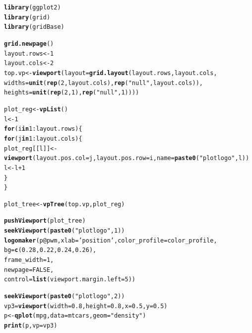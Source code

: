 \documentclass[12pt]{article}\usepackage[]{graphicx}\usepackage[usenames,dvipsnames]{color}
\makeatletter
\newcommand{\hlnum}[1]{\textcolor[rgb]{0.686,0.059,0.569}{#1}}%
\newcommand{\hlstr}[1]{\textcolor[rgb]{0.192,0.494,0.8}{#1}}%
\newcommand{\hlopt}[1]{\textcolor[rgb]{0,0,0}{#1}}%
\newcommand{\hlstd}[1]{\textcolor[rgb]{0.345,0.345,0.345}{#1}}%
\newcommand{\hlkwa}[1]{\textcolor[rgb]{0.161,0.373,0.58}{\textbf{#1}}}%
\newcommand{\hlkwb}[1]{\textcolor[rgb]{0.69,0.353,0.396}{#1}}%
\newcommand{\hlkwc}[1]{\textcolor[rgb]{0.333,0.667,0.333}{#1}}%
\newcommand{\hlkwd}[1]{\textcolor[rgb]{0.737,0.353,0.396}{\textbf{#1}}}%
\newenvironment{kframe}{%
 \def\at@end@of@kframe{}%
 \ifinner\ifhmode%
  \def\at@end@of@kframe{\end{minipage}}%
  \begin{minipage}{\columnwidth}%
 \fi\fi%
 \def\FrameCommand##1{\hskip\@totalleftmargin \hskip-\fboxsep
 \colorbox{shadecolor}{##1}\hskip-\fboxsep
     \hskip-\linewidth \hskip-\@totalleftmargin \hskip\columnwidth}%
 \MakeFramed {\advance\hsize-\width
   \@totalleftmargin\z@ \linewidth\hsize
   \@setminipage}}%
 {\par\unskip\endMakeFramed%
 \at@end@of@kframe}
\newenvironment{knitrout}{}{} %
\makeatother
\begin{document}
\begin{knitrout}
\color{fgcolor}\begin{kframe}
\begin{alltt}
\hlkwd{library}\hlstd{(ggplot2)}
\hlkwd{library}\hlstd{(grid)}
\hlkwd{library}\hlstd{(gridBase)}


\hlkwd{grid.newpage}\hlstd{()}
\hlstd{layout.rows} \hlkwb{<-} \hlnum{1}
\hlstd{layout.cols} \hlkwb{<-} \hlnum{2}
\hlstd{top.vp} \hlkwb{<-} \hlkwd{viewport}\hlstd{(}\hlkwc{layout}\hlstd{=}\hlkwd{grid.layout}\hlstd{(layout.rows, layout.cols,}
                                      \hlkwc{widths}\hlstd{=}\hlkwd{unit}\hlstd{(}\hlkwd{rep}\hlstd{(}\hlnum{2}\hlstd{,layout.cols),} \hlkwd{rep}\hlstd{(}\hlstr{"null"}\hlstd{, layout.cols)),}
                                      \hlkwc{heights}\hlstd{=}\hlkwd{unit}\hlstd{(}\hlkwd{rep}\hlstd{(}\hlnum{2}\hlstd{,}\hlnum{1}\hlstd{),} \hlkwd{rep}\hlstd{(}\hlstr{"null"}\hlstd{,}\hlnum{1}\hlstd{))))}

\hlstd{plot_reg} \hlkwb{<-} \hlkwd{vpList}\hlstd{()}
\hlstd{l} \hlkwb{<-} \hlnum{1}
\hlkwa{for}\hlstd{(i} \hlkwa{in} \hlnum{1}\hlopt{:}\hlstd{layout.rows)\{}
  \hlkwa{for}\hlstd{(j} \hlkwa{in} \hlnum{1}\hlopt{:}\hlstd{layout.cols)\{}
    \hlstd{plot_reg[[l]]} \hlkwb{<-} \hlkwd{viewport}\hlstd{(}\hlkwc{layout.pos.col} \hlstd{= j,} \hlkwc{layout.pos.row} \hlstd{= i,} \hlkwc{name} \hlstd{=} \hlkwd{paste0}\hlstd{(}\hlstr{"plotlogo"}\hlstd{, l))}
    \hlstd{l} \hlkwb{<-} \hlstd{l}\hlopt{+}\hlnum{1}
  \hlstd{\}}
\hlstd{\}}


\hlstd{plot_tree} \hlkwb{<-} \hlkwd{vpTree}\hlstd{(top.vp, plot_reg)}

\hlkwd{pushViewport}\hlstd{(plot_tree)}
\hlkwd{seekViewport}\hlstd{(}\hlkwd{paste0}\hlstd{(}\hlstr{"plotlogo"}\hlstd{,} \hlnum{1}\hlstd{))}
\hlkwd{logomaker}\hlstd{(p}\hlopt{@}\hlkwc{pwm}\hlstd{,}\hlkwc{xlab} \hlstd{=} \hlstr{'position'}\hlstd{,}\hlkwc{color_profile} \hlstd{= color_profile,}
          \hlkwc{bg} \hlstd{=} \hlkwd{c}\hlstd{(}\hlnum{0.28}\hlstd{,} \hlnum{0.22}\hlstd{,} \hlnum{0.24}\hlstd{,} \hlnum{0.26}\hlstd{),}
          \hlkwc{frame_width} \hlstd{=} \hlnum{1}\hlstd{,}
          \hlkwc{newpage} \hlstd{=} \hlnum{FALSE}\hlstd{,}
          \hlkwc{control} \hlstd{=} \hlkwd{list}\hlstd{(}\hlkwc{viewport.margin.left} \hlstd{=} \hlnum{5}\hlstd{))}


\hlkwd{seekViewport}\hlstd{(}\hlkwd{paste0}\hlstd{(}\hlstr{"plotlogo"}\hlstd{,} \hlnum{2}\hlstd{))}
\hlstd{vp3} \hlkwb{=} \hlkwd{viewport}\hlstd{(}\hlkwc{width}\hlstd{=}\hlnum{0.8}\hlstd{,} \hlkwc{height}\hlstd{=}\hlnum{0.8}\hlstd{,} \hlkwc{x} \hlstd{=} \hlnum{0.5}\hlstd{,} \hlkwc{y} \hlstd{=} \hlnum{0.5}\hlstd{)}
\hlstd{p} \hlkwb{<-} \hlkwd{qplot}\hlstd{(mpg,} \hlkwc{data}\hlstd{=mtcars,} \hlkwc{geom}\hlstd{=}\hlstr{"density"}\hlstd{)}
\hlkwd{print}\hlstd{(p,} \hlkwc{vp} \hlstd{= vp3)}
\end{alltt}
\end{kframe}
\end{knitrout}
\end{document}
